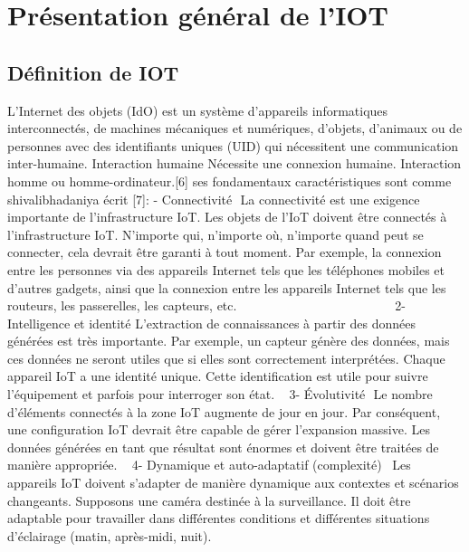 \chapter{Présentation général de l’IOT} \label{chap:Présentation général de l’IOT}
\section{Définition de IOT}
L'Internet des objets (IdO) est un système d'appareils informatiques interconnectés, de machines mécaniques et numériques, d'objets, d'animaux ou de personnes avec des identifiants uniques (UID) qui nécessitent une communication inter-humaine. Interaction humaine Nécessite une connexion humaine. Interaction homme ou homme-ordinateur.[6] ses fondamentaux caractéristiques sont comme shivalibhadaniya écrit  [7]: - Connectivité \newline La connectivité est une exigence importante de l’infrastructure IoT. Les objets de l’IoT doivent être connectés à l’infrastructure IoT. N’importe qui, n’importe où, n’importe quand peut se connecter, cela devrait être garanti à tout moment. Par exemple, la connexion entre les personnes via des appareils Internet tels que les téléphones mobiles et d’autres gadgets, ainsi que la connexion entre les appareils Internet tels que les routeurs, les passerelles, les capteurs, etc.  \newline                            
2- Intelligence et identité \newline
L’extraction de connaissances à partir des données générées est très importante. Par exemple, un capteur génère des données, mais ces données ne seront utiles que si elles sont correctement interprétées. Chaque appareil IoT a une identité unique. Cette identification est utile pour suivre l’équipement et parfois pour interroger son état.\newline  
3- Évolutivité \newline Le nombre d’éléments connectés à la zone IoT augmente de jour en jour. Par conséquent, une configuration IoT devrait être capable de gérer l’expansion massive. Les données générées en tant que résultat sont énormes et doivent être traitées de manière appropriée.\newline  
4- Dynamique et auto-adaptatif (complexité) \newline
 Les appareils IoT doivent s’adapter de manière dynamique aux contextes et scénarios changeants. Supposons une caméra destinée à la surveillance. Il doit être adaptable pour travailler dans différentes conditions et différentes situations d’éclairage (matin, après-midi, nuit).\newline  
